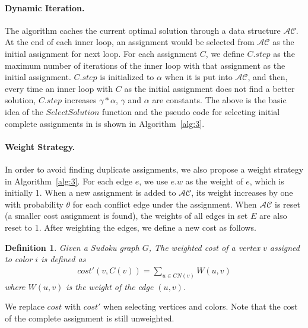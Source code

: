 \documentclass{article}
\newtheorem{Definition}{Definition}
\begin{document}
\paragraph{Dynamic Iteration.} The algorithm caches the current optimal solution through a data structure $\mathcal{AC}$. At the end of each inner loop, an assignment would be selected from $\mathcal{AC}$ as the initial assignment for next loop. For each assignment $C$, we define $C.step$ as the maximum number of iterations of the inner loop with that assignment as the initial assignment. $C.step$ is initialized to $\alpha$ when it is put into $\mathcal{AC}$, and then, every time an inner loop with $C$ as the initial assignment does not find a better solution, $C.step$ increases $\gamma*\alpha$, $\gamma$ and $\alpha$ are constants.  The above is the basic idea of the $SelectSolution$ function and the pseudo code for selecting initial complete assignments in is shown in Algorithm~\ref{alg:3}.


\paragraph{Weight Strategy.} In order to avoid finding duplicate assignments, we also propose a weight strategy in Algorithm~\ref{alg:3}. For each edge $e$, we use $e.w$ as the weight of $e$, which is initially 1. When a new assignment is added to $\mathcal{AC}$, its weight increases by one with probability $\theta$ for each conflict edge under the assignment. When $\mathcal{AC}$ is reset (a smaller cost assignment is found), the weights of all edges in set $E$ are also reset to 1. After weighting the edges, we define a new cost as follows.

\begin{Definition}
Given a Sudoku graph $G$, The weighted cost of a vertex $v$ assigned to color $i$ is defined as
\begin{align}
    cost'(v, C(v)) =  \sum_{u \in CN(v)}{W(u,v)}
\end{align}%
where $W(u,v)$ is the weight of the edge $(u,v)$.
\end{Definition}

We replace $cost$ with $cost'$ when selecting vertices and colors. Note that the cost of the complete assignment is still unweighted.
\end{document}

